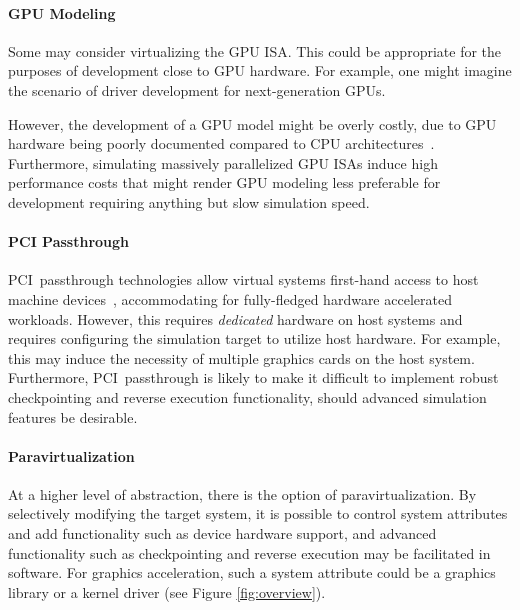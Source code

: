\paragraph{GPU Modeling}
\label{par:previousresearch_graphicsvirtualization_gpumodeling}
Some may consider virtualizing the GPU ISA.
This could be appropriate for the purposes of development close to GPU hardware.
For example, one might imagine the scenario of driver development for next-generation GPUs.

However, the development of a GPU model might be overly costly, due to GPU hardware being poorly documented compared to CPU architectures~.
Furthermore, simulating massively parallelized GPU ISAs induce high performance costs that might render GPU modeling less preferable for development requiring anything but slow simulation speed.

\paragraph{PCI Passthrough}
\label{par:previousresearch_graphicsvirtualization_pcipassthrough}
PCI~passthrough technologies allow virtual systems first-hand access to host machine devices~, accommodating for fully-fledged hardware accelerated workloads.
However, this requires \textit{dedicated} hardware on host systems and requires configuring the simulation target to utilize host hardware.
For example, this may induce the necessity of multiple graphics cards on the host system.
Furthermore, PCI~passthrough is likely to make it difficult to implement robust checkpointing and reverse execution functionality, should advanced simulation features be desirable.

\paragraph{Paravirtualization}
\label{par:previousresearch_graphicsvirtualization_paravirtualization}
At a higher level of abstraction, there is the option of paravirtualization.
By selectively modifying the target system, it is possible to control system attributes and add functionality such as device hardware support, and advanced functionality such as checkpointing and reverse execution may be facilitated in software.
For graphics acceleration, such a system attribute could be a graphics library or a kernel driver (see Figure \ref{fig:overview}).

